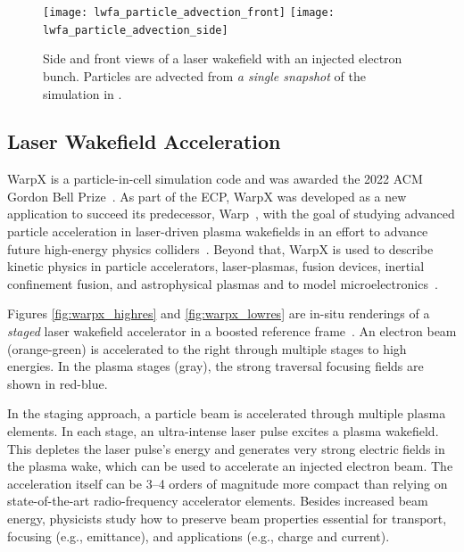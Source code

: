 \begin{figure}[ht]
  \centering
  \texttt{[image: lwfa\_particle\_advection\_front]}%
  \texttt{[image: lwfa\_particle\_advection\_side]}
  \caption{Side and front views of a laser wakefield with an injected electron bunch.
  Particles are advected from \emph{a single snapshot} of the simulation in \vtkm.}
  \label{fig:lwfa_particle_advection}
\end{figure}

\subsection{Laser Wakefield Acceleration}\label{sec:warpx}

%
%
WarpX is a particle-in-cell simulation code and was awarded the 2022 ACM Gordon Bell Prize~\citep{FedeliHuebl2022}.
As part of the ECP, WarpX was developed as a new application to succeed its predecessor, Warp~\citep{Vay2013}, with the goal of studying advanced particle acceleration in laser-driven plasma wakefields in an effort to advance future high-energy physics colliders~\citep{Albert2021}.
Beyond that, WarpX is used to describe kinetic physics in particle accelerators, laser-plasmas, fusion devices, inertial confinement fusion, and astrophysical plasmas and to model microelectronics~\citep{Yao2022}.

Figures \ref{fig:warpx_highres} and \ref{fig:warpx_lowres} are in-situ renderings of a \emph{staged} laser wakefield accelerator in a boosted reference frame~\citep{Vay2011}.
An electron beam (orange-green) is accelerated to the right through multiple stages to high energies.
In the plasma stages (gray), the strong traversal focusing fields are shown in red-blue.

In the staging approach, a particle beam is accelerated through multiple plasma elements.
In each stage, an ultra-intense laser pulse excites a plasma wakefield.
This depletes the laser pulse's energy and generates very strong electric fields in the plasma wake, which can be used to accelerate an injected electron beam.
The acceleration itself can be 3--4 orders of magnitude more compact than relying on state-of-the-art radio-frequency accelerator elements.
Besides increased beam energy, physicists study how to preserve beam properties essential for transport, focusing (e.g., emittance), and applications (e.g., charge and current).

